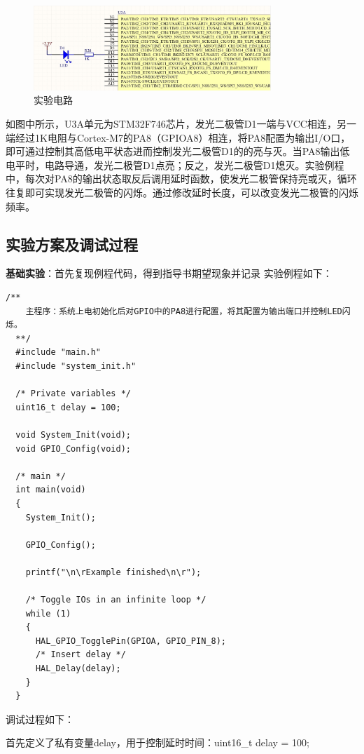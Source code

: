 ﻿\documentclass[UTF8,12pt]{article}
\begin{document}
\begin{enumerate}
    \begin{figure}[htbp]
        \centering
        \includegraphics[width=0.8\textwidth]{imgs/1.jpg}
        \caption{实验电路}
    \end{figure}

    如图中所示，U3A单元为STM32F746芯片，发光二极管D1一端与VCC相连，另一端经过1K电阻与Cortex-M7的PA8（GPIOA8）相连，将PA8配置为输出I/O口，即可通过控制其高低电平状态进而控制发光二极管D1的的亮与灭。当PA8输出低电平时，电路导通，发光二极管D1点亮；反之，发光二极管D1熄灭。实验例程中，每次对PA8的输出状态取反后调用延时函数，使发光二极管保持亮或灭，循环往复即可实现发光二极管的闪烁。通过修改延时长度，可以改变发光二极管的闪烁频率。

\end{enumerate}

\subsection{实验方案及调试过程}
\noindent
\textbf{基础实验}：首先复现例程代码，得到指导书期望现象并记录
\noindent
实验例程如下：

\begin{lstlisting}[frame=shadowbox]
    /**
    主程序：系统上电初始化后对GPIO中的PA8进行配置，将其配置为输出端口并控制LED闪烁。
  **/
  #include "main.h"
  #include "system_init.h"
  
  /* Private variables */
  uint16_t delay = 100;
  
  void System_Init(void);
  void GPIO_Config(void);
  
  /* main */
  int main(void)
  {
    System_Init();
    
    GPIO_Config();
    
    printf("\n\rExample finished\n\r");
      
    /* Toggle IOs in an infinite loop */
    while (1)
    {
      HAL_GPIO_TogglePin(GPIOA, GPIO_PIN_8);
      /* Insert delay */
      HAL_Delay(delay);
    }
  }  
\end{lstlisting}
调试过程如下：

首先定义了私有变量delay，用于控制延时时间：uint16\_t delay = 100;
\end{document}
